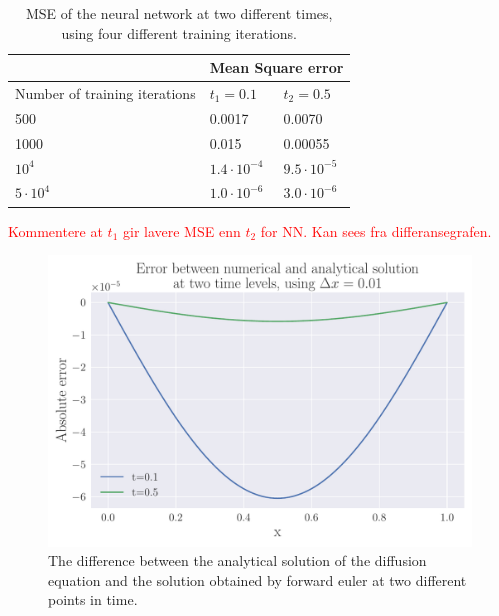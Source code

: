 \documentclass[12pt]{extarticle}
\begin{document}
\begin{table}[h]
	\centering
	\begin{tabular}{l|ll|}
		\cline{2-3}
		& \multicolumn{2}{l|}{Mean Square error} \\ \hline
		\multicolumn{1}{|l|}{Number of training iterations} & \multicolumn{1}{l|}{$t_1 = 0.1$} & $t_2 = 0.5$ \\ \hline
		\multicolumn{1}{|l|}{500}                           & \multicolumn{1}{l|}{0.0017}  & 0.0070  \\ \hline
		\multicolumn{1}{|l|}{1000}                          & \multicolumn{1}{l|}{0.015}   & 0.00055 \\ \hline
		\multicolumn{1}{|l|}{$10^4$}                          & \multicolumn{1}{l|}{$1.4\cdot 10^{-4}$}  & $9.5\cdot10^{-5}$  \\ \hline
		\multicolumn{1}{|l|}{$5\cdot10^4$}                        & \multicolumn{1}{l|}{$1.0\cdot10^{-6}$}        & $3.0\cdot10^{-6}$        \\ \hline
	\end{tabular}
	\caption{MSE of the neural network at two different times, using four different training iterations.}
	\label{tab:NN_MSE_iterations}
\end{table}

\textcolor{red}{Kommentere at $t_1$ gir lavere MSE enn $t_2$ for NN. Kan sees fra differansegrafen.}

\begin{figure}[h]
	\centering
	\includegraphics[width=0.75\linewidth]{../output/plots/error_FE_x_dx_001.pdf}
	\caption{The difference between the analytical solution of the diffusion equation and the solution obtained by forward euler at two different points in time.}
	\label{fig:FE_absolute_difference}
\end{figure}
\end{document}
